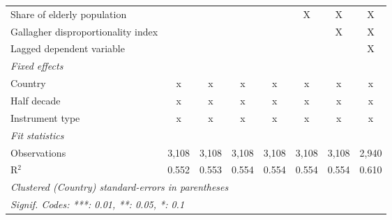 \begin{tabular}{lccccccc}
   Share of elderly population                                            &               &               &               &               & X             & X             & X\\  
   Gallagher disproportionality index                                     &               &               &               &               &               & X             & X\\  
   Lagged dependent variable                                              &               &               &               &               &               &               & X\\  
   \emph{Fixed effects}\\
   Country                                                                & x             & x             & x             & x             & x             & x             & x\\  
   Half decade                                                            & x             & x             & x             & x             & x             & x             & x\\  
   Instrument type                                                        & x             & x             & x             & x             & x             & x             & x\\  
   \midrule \emph{Fit statistics}\\
   Observations                                                           & 3,108         & 3,108         & 3,108         & 3,108         & 3,108         & 3,108         & 2,940\\  
   R$^2$                                                                  & 0.552         & 0.553         & 0.554         & 0.554         & 0.554         & 0.554         & 0.610\\  
   \midrule
   \multicolumn{8}{l}{\emph{Clustered (Country) standard-errors in parentheses}}\\
   \multicolumn{8}{l}{\emph{Signif. Codes: ***: 0.01, **: 0.05, *: 0.1}}\\
\end{tabular}
\par\endgroup


